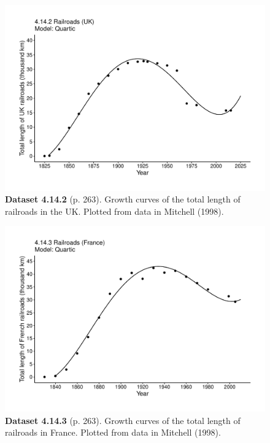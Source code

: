 \documentclass[aps,rmp,preprint,superscriptaddress,10pt,onecolumn]{article}
\begin{document}
\clearpage
\begin{figure}[h]
\includegraphics[width=\textwidth]{output/figs-ggplot/4.14.2.pdf}
\caption*{\textbf{Dataset 4.14.2} (p. 263). Growth curves of the total length of railroads in the UK. Plotted from data in Mitchell (1998).}
\end{figure}
	
\clearpage
\begin{figure}[h]
\includegraphics[width=\textwidth]{output/figs-ggplot/4.14.3.pdf}
\caption*{\textbf{Dataset 4.14.3} (p. 263). Growth curves of the total length of railroads in France. Plotted from data in Mitchell (1998).}
\end{figure}
	
\end{document}
